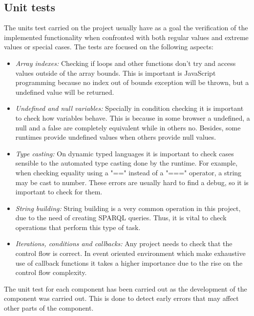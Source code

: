 \subsection{Unit tests}

The units test carried on the project usually have as a goal the verification of the implemented functionality when confronted with both regular values and extreme values or special cases. The tests are focused on the following aspects:

\begin{itemize}
\item \textit{Array indexes:} Checking if loops and other functions don't try and access values outside of the array bounds. This is important is JavaScript programming because no index out of bounds exception will be thrown, but a undefined value will be returned.

\item \textit{Undefined and null variables:} Specially in condition checking it is important to check how variables behave. This is because in some browser a undefined, a null and a false are completely equivalent while in others no. Besides, some runtimes provide undefined values when others provide null values.

\item \textit{Type casting:} On dynamic typed languages it is important to check cases sensible to the automated type casting done by the runtime. For example, when checking equality using a "==" instead of a "===" operator, a string may be cast to number. These errors are usually hard to find a debug, so it is important to check for them.

\item \textit{String building:} String building is a very common operation in this project, due to the need of creating SPARQL queries. Thus, it is vital to check operations that perform this type of task.

\item \textit{Iterations, conditions and callbacks:} Any project needs to check that the control flow is correct. In event oriented environment which make exhaustive use of callback functions it takes a higher importance due to the rise on the control flow complexity.
\end{itemize}

The unit test for each component has been carried out as the development of the component was carried out. This is done to detect early errors that may affect other parts of the component.


